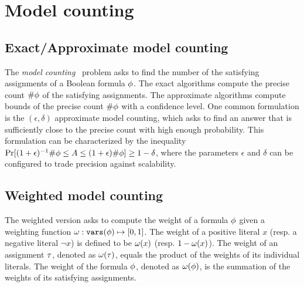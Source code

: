 \section{Model counting}
\label{sect:background-model-counting}

\subsection{Exact/Approximate model counting}
The \textit{model counting}~\cite{SATHandbook-ModelCounting} problem asks to find the number of the satisfying assignments of a Boolean formula $\phi$.
The exact algorithms compute the precise count $\#\phi$ of the satisfying assignments.
The approximate algorithms compute bounds of the precise count $\#\phi$ with a confidence level.
One common formulation is the $(\epsilon,\delta)$ approximate model counting,
which asks to find an answer that is sufficiently close to the precise count with high enough probability.
This formulation can be characterized by the inequality
$\Pr[(1+\epsilon)^{-1}\#\phi\leq A\leq (1+\epsilon)\#\phi]\geq 1-\delta$,
where the parameters $\epsilon$ and $\delta$ can be configured to trade precision against scalability.

\subsection{Weighted model counting}
The weighted version asks to compute the weight of a formula $\phi$ given a weighting function $\omega:\texttt{vars}(\phi)\mapsto[0,1]$.
The weight of a positive literal $x$ (resp. a negative literal $\lnot x$) is defined to be $\omega(x)$ (resp. $1-\omega(x)$).
The weight of an assignment $\tau$, denoted as $\omega(\tau)$, equals the product of the weights of its individual literals.
The weight of the formula $\phi$, denoted as $\omega(\phi)$, is the summation of the weights of its satisfying assignments.